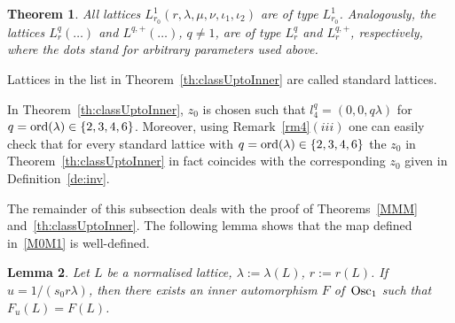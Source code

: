 \documentclass[10pt,a4paper]{amsart}
\newcommand{\Osc}{{\rm Osc}}
\newcommand{\ord}{{\rm ord}}
\numberwithin{equation}{section}
\newtheorem{Theorem}{Theorem}[section]
\newtheorem{Lemma}[Theorem]{Lemma}
\begin{document}
\begin{Theorem}
All lattices $L^1_{r_0}(r,\lambda,\mu,\nu,\iota_1,\iota_2)$ are of type $L^1_{r_0}$. Analogously, the lattices $L^q_r(\dots)$ and $L^{q,+}(\dots)$, $q\not=1$, are of type $L^q_r$ and $L^{q,+}_r$, respectively, where the dots stand for arbitrary parameters used above.
\end{Theorem}

\begin{Definition}
Lattices in the list in Theorem~\ref{th:classUptoInner} are called standard lattices.
\end{Definition}

\begin{Remark}\label{z0}
In Theorem~\ref{th:classUptoInner}, $z_0$ is chosen such that $l_4^q=(0,0,q\lambda)$ for $q=\ord(\lambda)\in\{2,3,4,6\}$. Moreover, using Remark~\ref{rm4}$(iii)$ one can easily check that for every standard lattice with $q=\ord(\lambda)\in\{2,3,4,6\}$ the $z_0$ in Theorem~\ref{th:classUptoInner} in fact coincides with the corresponding $z_0$ given in Definition~\ref{de:inv}.
\end{Remark}
%
The remainder of this subsection deals with the proof of Theorems~\ref{MMM} and~\ref{th:classUptoInner}. The following lemma shows that the map defined in~\eqref{M0M1} is well-defined.
%
\begin{Lemma}\label{pr:shift}
Let $L$ be a normalised lattice, $\lambda:=\lambda(L)$, $r:=r(L)$. If~$u=1/(s_0r\lambda)$, then there exists an inner automorphism $F$ of~$\Osc_1$ such that $F_u (L)=F(L)$.
\end{Lemma}
\end{document}
